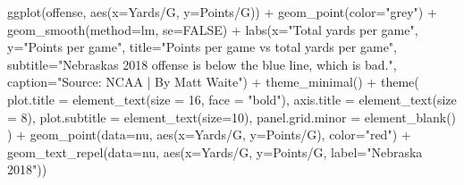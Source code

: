 \documentclass[
]{book}
\newenvironment{Shaded}{\begin{snugshade}}{\end{snugshade}}
\newcommand{\AttributeTok}[1]{\textcolor[rgb]{0.77,0.63,0.00}{#1}}
\newcommand{\ConstantTok}[1]{\textcolor[rgb]{0.00,0.00,0.00}{#1}}
\newcommand{\DecValTok}[1]{\textcolor[rgb]{0.00,0.00,0.81}{#1}}
\newcommand{\FunctionTok}[1]{\textcolor[rgb]{0.00,0.00,0.00}{#1}}
\newcommand{\NormalTok}[1]{#1}
\newcommand{\SpecialCharTok}[1]{\textcolor[rgb]{0.00,0.00,0.00}{#1}}
\newcommand{\StringTok}[1]{\textcolor[rgb]{0.31,0.60,0.02}{#1}}
\begin{document}
\begin{Shaded}
\begin{Highlighting}[]
\FunctionTok{ggplot}\NormalTok{(offense, }\FunctionTok{aes}\NormalTok{(}\AttributeTok{x=}\StringTok{\textasciigrave{}}\AttributeTok{Yards/G}\StringTok{\textasciigrave{}}\NormalTok{, }\AttributeTok{y=}\StringTok{\textasciigrave{}}\AttributeTok{Points/G}\StringTok{\textasciigrave{}}\NormalTok{)) }\SpecialCharTok{+} 
  \FunctionTok{geom\_point}\NormalTok{(}\AttributeTok{color=}\StringTok{"grey"}\NormalTok{) }\SpecialCharTok{+} \FunctionTok{geom\_smooth}\NormalTok{(}\AttributeTok{method=}\NormalTok{lm, }\AttributeTok{se=}\ConstantTok{FALSE}\NormalTok{) }\SpecialCharTok{+} 
  \FunctionTok{labs}\NormalTok{(}\AttributeTok{x=}\StringTok{"Total yards per game"}\NormalTok{, }\AttributeTok{y=}\StringTok{"Points per game"}\NormalTok{, }\AttributeTok{title=}\StringTok{"Points per game vs total yards per game"}\NormalTok{, }\AttributeTok{subtitle=}\StringTok{"Nebraska\textquotesingle{}s 2018 offense is below the blue line, which is bad."}\NormalTok{, }\AttributeTok{caption=}\StringTok{"Source: NCAA | By Matt Waite"}\NormalTok{) }\SpecialCharTok{+} 
  \FunctionTok{theme\_minimal}\NormalTok{() }\SpecialCharTok{+} 
  \FunctionTok{theme}\NormalTok{(}
    \AttributeTok{plot.title =} \FunctionTok{element\_text}\NormalTok{(}\AttributeTok{size =} \DecValTok{16}\NormalTok{, }\AttributeTok{face =} \StringTok{"bold"}\NormalTok{),}
    \AttributeTok{axis.title =} \FunctionTok{element\_text}\NormalTok{(}\AttributeTok{size =} \DecValTok{8}\NormalTok{), }
    \AttributeTok{plot.subtitle =} \FunctionTok{element\_text}\NormalTok{(}\AttributeTok{size=}\DecValTok{10}\NormalTok{), }
    \AttributeTok{panel.grid.minor =} \FunctionTok{element\_blank}\NormalTok{()}
\NormalTok{    ) }\SpecialCharTok{+}
  \FunctionTok{geom\_point}\NormalTok{(}\AttributeTok{data=}\NormalTok{nu, }\FunctionTok{aes}\NormalTok{(}\AttributeTok{x=}\StringTok{\textasciigrave{}}\AttributeTok{Yards/G}\StringTok{\textasciigrave{}}\NormalTok{, }\AttributeTok{y=}\StringTok{\textasciigrave{}}\AttributeTok{Points/G}\StringTok{\textasciigrave{}}\NormalTok{), }\AttributeTok{color=}\StringTok{"red"}\NormalTok{) }\SpecialCharTok{+} 
  \FunctionTok{geom\_text\_repel}\NormalTok{(}\AttributeTok{data=}\NormalTok{nu, }\FunctionTok{aes}\NormalTok{(}\AttributeTok{x=}\StringTok{\textasciigrave{}}\AttributeTok{Yards/G}\StringTok{\textasciigrave{}}\NormalTok{, }\AttributeTok{y=}\StringTok{\textasciigrave{}}\AttributeTok{Points/G}\StringTok{\textasciigrave{}}\NormalTok{, }\AttributeTok{label=}\StringTok{"Nebraska 2018"}\NormalTok{))}
\end{Highlighting}
\end{Shaded}
\end{document}
